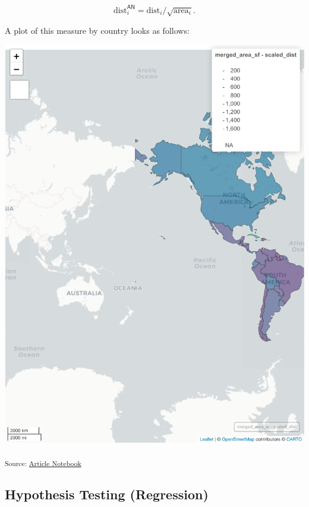 \documentclass[
  letterpaper,
  DIV=11,
  numbers=noendperiod]{scrartcl}
\begin{document}
\[
\text{dist}^{\textsf{AN}}_i = \text{dist}_i / \sqrt{\text{area}_i}.
\]

A plot of this measure by country looks as follows:

\includegraphics{index_files/figure-pdf/plot-area-1.pdf}

\textsubscript{Source:
\href{https://jpowerj.github.io/gis-manuscript-template/index.qmd.html}{Article
Notebook}}

\subsection{Hypothesis Testing
(Regression)}\label{hypothesis-testing-regression}
\end{document}
